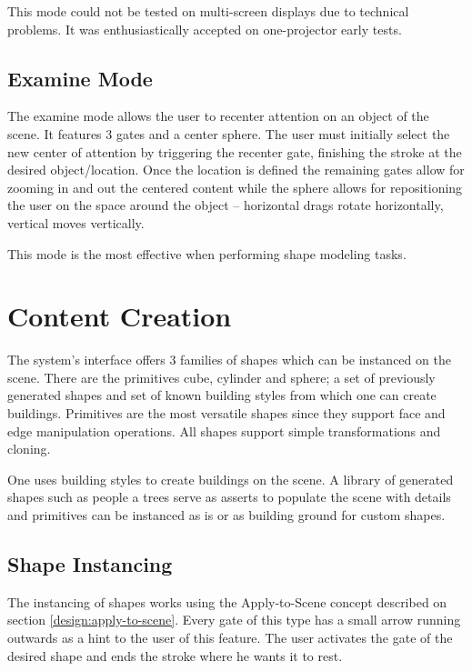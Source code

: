 This mode could not be tested on multi-screen displays due to technical problems. It was enthusiastically accepted on
one-projector early tests.



\subsection{Examine Mode}

The examine mode allows the user to recenter attention on an object of the scene.
It features 3 gates and a center sphere.
The user must initially select the new center of attention by triggering the recenter gate,
finishing the stroke at the desired object/location.
Once the location is defined the remaining gates allow for zooming in and out the centered content
while the sphere allows for repositioning the user on the space around the object -- 
horizontal drags rotate horizontally, vertical moves vertically.

This mode is the most effective when performing shape modeling tasks.



\section{Content Creation}

The system's interface offers 3 families of shapes which can be instanced on the scene.
There are the primitives cube, cylinder and sphere; a set of previously generated shapes
and set of known building styles from which one can create buildings.
Primitives are the most versatile shapes since they support face and edge manipulation operations.
All shapes support simple transformations and cloning.

One uses building styles to create buildings on the scene. A library of generated shapes such as
people a trees serve as asserts to populate the scene with details and primitives can be instanced
as is or as building ground for custom shapes.



\subsection{Shape Instancing}

The instancing of shapes works using the Apply-to-Scene concept described on section \ref{design:apply-to-scene}.
Every gate of this type has a small arrow running outwards as a hint to the user of this feature.
The user activates the gate of the desired shape and ends the stroke where he wants it to rest.

